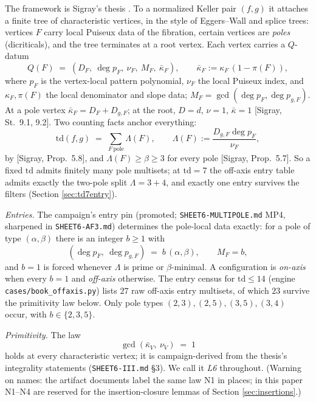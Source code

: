 \documentclass[11pt]{article}
\theoremstyle{definition}
\theoremstyle{remark}
\newcommand{\kb}{\bar\kappa}
\begin{document}
The framework is Sigray's thesis \cite{Sigray}. To a normalized Keller pair $(f,g)$ it attaches a finite tree of characteristic vertices, in the style of Eggers--Wall and splice trees: vertices $F$ carry local Puiseux data of the fibration, certain vertices are \emph{poles} (dicriticals), and the tree terminates at a root vertex. Each vertex carries a $Q$-datum
\[
Q(F)\;=\;(D_F,\ \deg p_F,\ \nu_F,\ M_F,\ \kb_F),\qquad \kb_F:=\kappa_F\,(1-\pi(F)),
\]
where $p_F$ is the vertex-local pattern polynomial, $\nu_F$ the local Puiseux index, and $\kappa_F,\pi(F)$ the local denominator and slope data; $M_F=\gcd(\deg p_F,\deg p_{g,F})$. At a pole vertex $\kb_F=D_F+D_{g,F}$; at the root, $D=d$, $\nu=1$, $\kb=1$ [Sigray, St.~9.1, 9.2]. Two counting facts anchor everything:
\begin{equation}\label{eq:tdsum}
\mathrm{td}(f,g)\;=\;\sum_{F\ \mathrm{pole}}\Lambda(F),\qquad \Lambda(F):=\frac{D_{g,F}\deg p_F}{\nu_F},
\end{equation}
by [Sigray, Prop.~5.8], and $\Lambda(F)\geq\beta\geq 3$ for every pole [Sigray, Prop.~5.7]. So a fixed $\mathrm{td}$ admits finitely many pole multisets; at $\mathrm{td}=7$ the off-axis entry table admits exactly the two-pole split $\Lambda=3+4$, and exactly one entry survives the filters (Section \ref{sec:td7entry}).

\emph{Entries.} The campaign's entry pin (promoted; \texttt{SHEET6-MULTIPOLE.md} MP4, sharpened in \texttt{SHEET6-AF3.md}) determines the pole-local data exactly: for a pole of type $(\alpha,\beta)$ there is an integer $b\geq 1$ with
\[
(\deg p_F,\ \deg p_{g,F})\;=\;b\,(\alpha,\beta),\qquad M_F=b,
\]
and $b=1$ is forced whenever $\Lambda$ is prime or $\beta$-minimal. A configuration is \emph{on-axis} when every $b=1$ and \emph{off-axis} otherwise. The entry census for $\mathrm{td}\leq 14$ (engine \texttt{cases/book\_offaxis.py}) lists $27$ raw off-axis entry multisets, of which $23$ survive the primitivity law below. Only pole types $(2,3),(2,5),(3,5),(3,4)$ occur, with $b\in\{2,3,5\}$.

\emph{Primitivity.} The law
\begin{equation}\label{eq:L6}
\gcd(\kb_V,\ \nu_V)\;=\;1
\end{equation}
holds at every characteristic vertex; it is campaign-derived from the thesis's integrality statements (\texttt{SHEET6-III.md} \S3). We call it \emph{L6} throughout. (Warning on names: the artifact documents label the same law N1 in places; in this paper N1--N4 are reserved for the insertion-closure lemmas of Section \ref{sec:insertions}.)
\end{document}
